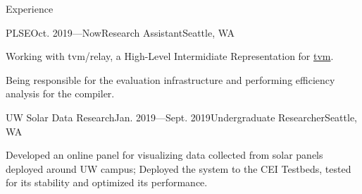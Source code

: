 \documentclass{resume}
\begin{document}

	\begin{rSection}{Experience}



		\begin{rSubsection}{PLSE}{Oct. 2019---Now}{Research Assistant}{Seattle, WA} 
			\item Working with tvm/relay, a High-Level Intermidiate Representation for \href{https://tvm.ai/}{tvm}.
			\item Being responsible for the evaluation infrastructure and performing efficiency analysis for the compiler.
		\end{rSubsection}
		\vspace{-5pt}


		\begin{rSubsection}{UW Solar Data Research}{Jan. 2019---Sept. 2019}{Undergraduate Researcher}{Seattle, WA}
			\item Developed an online panel for visualizing data collected from solar panels deployed around UW campus; Deployed the system to the CEI Testbeds, tested for its stability and optimized its performance.
		\end{rSubsection}
		\vspace{-5pt}


	\end{rSection}
	\vspace{-5pt}
\end{document}
